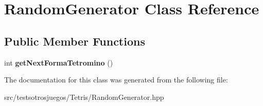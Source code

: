 \hypertarget{class_random_generator}{}\section{Random\+Generator Class Reference}
\label{class_random_generator}
\subsection*{Public Member Functions}
\begin{DoxyCompactItemize}
\item 
int {\bfseries get\+Next\+Forma\+Tetromino} ()\hypertarget{class_random_generator_a5d6018527081f5279ee961eaaaf6babc}{}\label{class_random_generator_a5d6018527081f5279ee961eaaaf6babc}

\end{DoxyCompactItemize}


The documentation for this class was generated from the following file\+:\begin{DoxyCompactItemize}
\item 
src/testsotrosjuegos/\+Tetris/Random\+Generator.\+hpp\end{DoxyCompactItemize}
